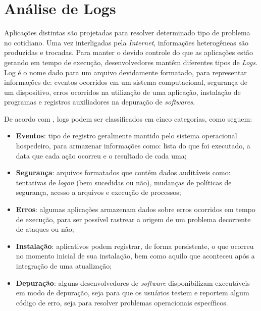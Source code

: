 \section{Análise de Logs}
    
    \vspace{10.5cm}
    
    \hspace{1cm}
    Aplicações distintas são projetadas para resolver determinado tipo de problema no cotidiano. Uma vez interligadas pela \textit{Internet}, informações heterogêneas são produzidas e trocadas. Para manter o devido controle do que as aplicações estão gerando em tempo de execução, desenvolvedores mantêm diferentes tipos de \textit{Logs}. Log é o nome dado para um arquivo devidamente formatado, para representar informações de: eventos ocorridos em um sistema computacional, segurança de um dispositivo, erros ocorridos na utilização de uma aplicação, instalação de programas e registros auxiliadores na depuração de \textit{softwares}.
    
    \vspace{4mm}
    
    \hspace{1cm}
    De acordo com , logs podem ser classificados em cinco categorias, como seguem:
    
    \begin{itemize}
        \item \textbf{Eventos}: tipo de registro geralmente mantido pelo sistema operacional hospedeiro, para armazenar informações como: lista do que foi executado, a data que cada ação ocorreu e o resultado de cada uma;
        \item \textbf{Segurança}: arquivos formatados que contém dados auditáveis como: tentativas de \textit{logon} (bem sucedidas ou não), mudanças de políticas de segurança, acesso a arquivos e execução de processos;
        \item \textbf{Erros}: algumas aplicações armazenam dados sobre erros ocorridos em tempo de execução, para ser possível rastrear a origem de um problema decorrente de ataques ou não;
        \item \textbf{Instalação}: aplicativos podem registrar, de forma persistente, o que ocorreu no momento inicial de sua instalação, bem como aquilo que aconteceu após a integração de uma atualização;
        \item \textbf{Depuração}: alguns desenvolvedores de \textit{software} disponibilizam executáveis em modo de depuração, seja para que os usuários testem e reportem algum código de erro, seja para resolver problemas operacionais específicos.
    \end{itemize}
    
